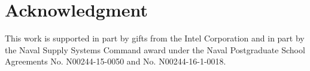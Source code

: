 \documentclass[10pt,emptycopyrightspace]{ewsn-proc}
\begin{document}
\section*{Acknowledgment}
  This work is supported in part by gifts from the Intel Corporation
  and in part by the Naval Supply Systems Command award under the
  Naval Postgraduate School Agreements No. N00244-15-0050
  and No. N00244-16-1-0018.


%
%
%
%
%



\end{document}

